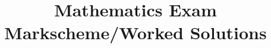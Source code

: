 \documentclass[a4paper,12pt]{article}
\begin{document}
 
\pagestyle{fancy}
\fancyhf{}                               
\renewcommand\headrulewidth{0pt} 
\title{\textbf{Mathematics Exam Markscheme/Worked Solutions}} %
\date{} %
\maketitle %

\end{document}
